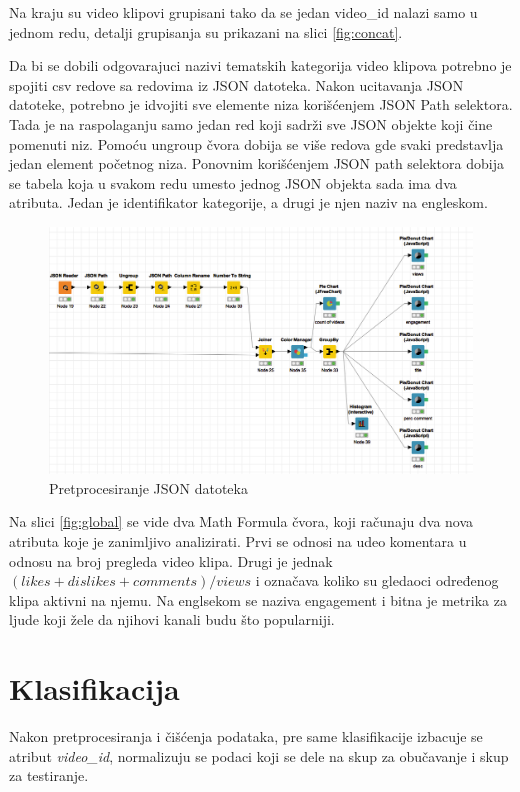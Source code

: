 \documentclass[a4paper]{article}
\theoremstyle{definition}
\begin{document}
Na kraju su video klipovi grupisani tako da se jedan video\_id nalazi samo u jednom redu, detalji grupisanja su prikazani na slici \ref{fig:concat}.

Da bi se dobili odgovarajuci nazivi tematskih kategorija video klipova potrebno je spojiti csv redove sa redovima iz JSON datoteka.
Nakon ucitavanja JSON datoteke, potrebno je idvojiti sve elemente niza korišćenjem JSON Path selektora. 
Tada je na raspolaganju samo jedan red koji sadrži sve JSON objekte koji čine pomenuti niz. 
Pomoću ungroup čvora dobija se više redova gde svaki predstavlja jedan element početnog niza.
Ponovnim korišćenjem JSON path selektora dobija se tabela koja u svakom redu umesto jednog JSON objekta
sada ima dva atributa. Jedan je identifikator kategorije, a drugi je njen naziv na engleskom.
\begin{figure}[h!]
\begin{center}
    \includegraphics[width=1\textwidth]{json_of_categories.png}
    \caption{Pretprocesiranje JSON datoteka}
    \label{fig:json}
\end{center}
\end{figure}

Na slici \ref{fig:global} se vide dva Math Formula čvora, koji računaju dva nova atributa koje je zanimljivo analizirati.
Prvi se odnosi na udeo komentara u odnosu na broj pregleda video klipa. Drugi je jednak 
$(likes + dislikes + comments) / views$ i označava koliko su gledaoci određenog klipa aktivni na njemu. Na englsekom se naziva engagement i 
bitna je metrika za ljude koji žele da njihovi kanali budu što popularniji.
\section{Klasifikacija}
\label{sec:klasifikacija}
Nakon pretprocesiranja i čišćenja podataka, pre same klasifikacije izbacuje se atribut \textit{video\_id}, normalizuju se podaci koji se dele na skup za obučavanje i skup za testiranje.
\end{document}
